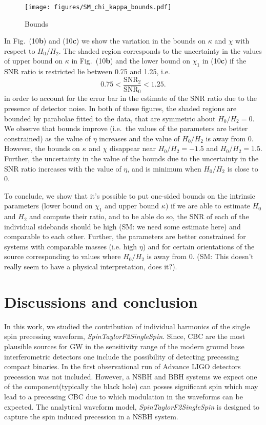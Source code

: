 \documentclass[preprint,onecolumn,,tightenlines,superscriptaddress,showpacs,nofootinbib,eqsecnum,amsfonts,amsmath]{revtex4}
\begin{document}
\begin{figure}[!htbp] \centering
\texttt{[image: figures/SM\_chi\_kappa\_bounds.pdf]} 
\caption{Bounds}
\label{chi--kappa_bounds}
\end{figure}

In Fig.~(10\textbf{b}) and (10\textbf{c})   we show the variation in the bounds
on $\kappa$ and $\chi$ with respect to $H_{0}/H_{2}$.  The shaded region
corresponds to the uncertainty in the values of upper bound on $\kappa$ in
Fig.~(10\textbf{b}) and the lower bound on $\chi_{1}$ in (10\textbf{c}) if the
SNR ratio is restricted lie between 0.75 and 1.25, i.e.
\begin{equation}
0.75 < \frac{\text{SNR}_{2}}{\text{SNR}_{0}} < 1.25.
\end{equation}
in order to account for the error bar in the estimate of the SNR ratio due to
the presence of detector noise. In both of these figures, the shaded regions
are bounded by parabolae fitted to the data, that are symmetric about
$H_{0}/H_{2} = 0$. We observe that bounds improve (i.e.~the values of the
parameters are better constrained) as the value of $\eta$ increases and the
value of $H_{0}/H_{2}$ is away from $0$. However, the bounds on $\kappa$
and $\chi$ disappear  near $H_{0}/H_{2}=-1.5$ and $H_{0}/H_{2}=1.5$. Further,
the uncertainty in the value of the bounds due to the uncertainty in the SNR
ratio increases with the value of $\eta$, and is minimum when $H_{0}/H_{2}$ is
close to $0$. 

To conclude, we show that it's possible to put one-sided bounds on the
intrinsic parameters (lower bound on $\chi_{1}$ and upper bound $\kappa$) if
we are able to estimate $H_{0}$ and $H_{2}$ and compute their ratio, and to be able do
so, the SNR of each of the individual  sidebands should be high (SM: we need
some estimate here) and comparable to each other. Further, the parameters are better
constrained for systems with comparable masses (i.e. high $\eta$) and for certain orientations
of the source corresponding to values where $H_{0}/H_{2}$ is
away from $0$. (SM: This doesn't really seem to have a physical interpretation, does it?). 
\section{Discussions and conclusion}
\label{conclusion} 
In this work, we studied the contribution of individual harmonics of the single
spin precessing waveform, {\it SpinTaylorF2SingleSpin}. Since, CBC are the most
plausible sources for GW in the sensitivity  range of the modern ground base
interferometric detectors one include the possibility of detecting precessing
compact binaries. In the first observational run of Advance LIGO detectors
precession was not included. However, a NSBH and BBH systems we expect one of
the component(typically the black hole) can posses significant spin which may
lead to a precessing CBC due to which modulation in the waveforms can be
expected.  The analytical waveform model, {\it SpinTaylorF2SingleSpin} is
designed to capture the spin induced precession in a NSBH system.
\end{document}
